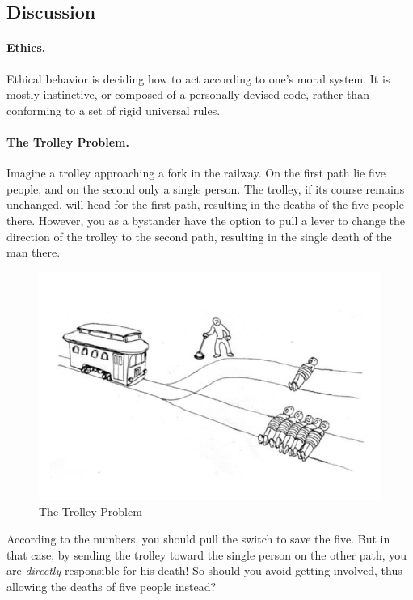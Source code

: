 \subsection{Discussion}
\paragraph{Ethics.} Ethical behavior is deciding how to act according to one’s moral system. It is mostly instinctive, or composed of a personally devised code, rather than conforming to a set of rigid universal rules.


\paragraph{The Trolley Problem.} Imagine a trolley approaching a fork in the railway. On the first path lie five people, and on the second only a single person. The trolley, if its course remains unchanged, will head for the first path, resulting in the deaths of the five people there. However, you as a bystander have the option to pull a lever to change the direction of the trolley to the second path, resulting in the single death of the man there.

\begin{figure}[!ht]
    \centering
    \includegraphics[width=\textwidth]{images/The_Trolley_Problem.jpg}
    \caption{The Trolley Problem}
    \label{fig:trolley_problem}
\end{figure}


According to the numbers, you should pull the switch to save the five. But in that case, by sending the trolley toward the single person on the other path, you are \textit{directly} responsible for his death! So should you avoid getting involved, thus allowing the deaths of five people instead?



